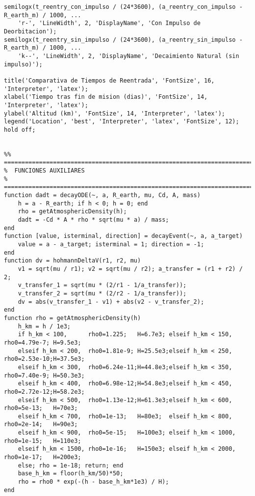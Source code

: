 \begin{verbatim}
semilogx(t_reentry_con_impulso / (24*3600), (a_reentry_con_impulso - R_earth_m) / 1000, ...
    'r-', 'LineWidth', 2, 'DisplayName', 'Con Impulso de Deorbitacion');
semilogx(t_reentry_sin_impulso / (24*3600), (a_reentry_sin_impulso - R_earth_m) / 1000, ...
    'k--', 'LineWidth', 2, 'DisplayName', 'Decaimiento Natural (sin impulso)');

title('Comparativa de Tiempos de Reentrada', 'FontSize', 16, 'Interpreter', 'latex');
xlabel('Tiempo tras fin de mision (dias)', 'FontSize', 14, 'Interpreter', 'latex');
ylabel('Altitud (km)', 'FontSize', 14, 'Interpreter', 'latex');
legend('Location', 'best', 'Interpreter', 'latex', 'FontSize', 12);
hold off;


%% ========================================================================
%  FUNCIONES AUXILIARES
%  ========================================================================
function dadt = decayODE(~, a, R_earth, mu, Cd, A, mass)
    h = a - R_earth; if h < 0; h = 0; end
    rho = getAtmosphericDensity(h);
    dadt = -Cd * A * rho * sqrt(mu * a) / mass;
end
function [value, isterminal, direction] = decayEvent(~, a, a_target)
    value = a - a_target; isterminal = 1; direction = -1;
end
function dv = hohmannDeltaV(r1, r2, mu)
    v1 = sqrt(mu / r1); v2 = sqrt(mu / r2); a_transfer = (r1 + r2) / 2;
    v_transfer_1 = sqrt(mu * (2/r1 - 1/a_transfer));
    v_transfer_2 = sqrt(mu * (2/r2 - 1/a_transfer));
    dv = abs(v_transfer_1 - v1) + abs(v2 - v_transfer_2);
end
function rho = getAtmosphericDensity(h)
    h_km = h / 1e3;
    if h_km < 100,      rho0=1.225;   H=6.7e3; elseif h_km < 150,  rho0=4.79e-7; H=9.5e3;
    elseif h_km < 200,  rho0=1.81e-9; H=25.5e3;elseif h_km < 250,  rho0=2.53e-10;H=37.5e3;
    elseif h_km < 300,  rho0=6.24e-11;H=44.8e3;elseif h_km < 350,  rho0=7.40e-9; H=50.3e3;
    elseif h_km < 400,  rho0=6.98e-12;H=54.8e3;elseif h_km < 450,  rho0=2.72e-12;H=58.2e3;
    elseif h_km < 500,  rho0=1.13e-12;H=61.3e3;elseif h_km < 600,  rho0=5e-13;   H=70e3;
    elseif h_km < 700,  rho0=1e-13;   H=80e3;  elseif h_km < 800,  rho0=2e-14;   H=90e3;
    elseif h_km < 900,  rho0=5e-15;   H=100e3; elseif h_km < 1000, rho0=1e-15;   H=110e3;
    elseif h_km < 1500, rho0=1e-16;   H=150e3; elseif h_km < 2000, rho0=1e-17;   H=200e3;
    else; rho = 1e-18; return; end
    base_h_km = floor(h_km/50)*50;
    rho = rho0 * exp(-(h - base_h_km*1e3) / H);
end


\end{verbatim}